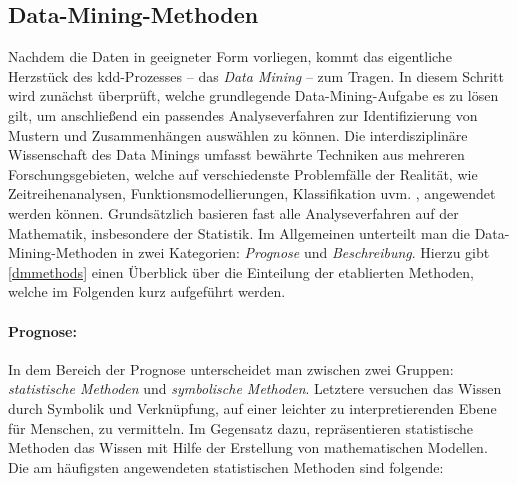 \subsection{Data-Mining-Methoden}
\label{dmmethoden}

Nachdem die Daten in geeigneter Form vorliegen, kommt das eigentliche Herzstück des \gls{kdd}-Prozesses -- das \textit{Data Mining} -- zum Tragen. In diesem Schritt wird zunächst überprüft, welche grundlegende Data-Mining-Aufgabe es zu lösen gilt, um anschließend ein passendes Analyseverfahren zur Identifizierung von Mustern und Zusammenhängen auswählen zu können. Die interdisziplinäre Wissenschaft des Data Minings umfasst bewährte Techniken aus mehreren Forschungsgebieten, welche auf verschiedenste Problemfälle der Realität, wie Zeitreihenanalysen, Funktionsmodellierungen, Klassifikation uvm. , angewendet werden können. Grundsätzlich basieren fast alle Analyseverfahren auf der Mathematik, insbesondere der Statistik. Im Allgemeinen unterteilt man die Data-Mining-Methoden in zwei Kategorien: \textit{Prognose} und \textit{Beschreibung}. Hierzu gibt \vref{dmmethods} einen Überblick über die Einteilung der etablierten Methoden, welche im Folgenden kurz aufgeführt werden.

\paragraph{Prognose:} In dem Bereich der Prognose unterscheidet man zwischen zwei Gruppen: \textit{statistische Methoden} und \textit{symbolische Methoden}. Letztere versuchen das Wissen durch Symbolik und Verknüpfung, auf einer leichter zu interpretierenden Ebene für Menschen, zu vermitteln. Im Gegensatz dazu, repräsentieren statistische Methoden das Wissen mit Hilfe der Erstellung von mathematischen Modellen. Die am häufigsten angewendeten statistischen Methoden sind folgende:

